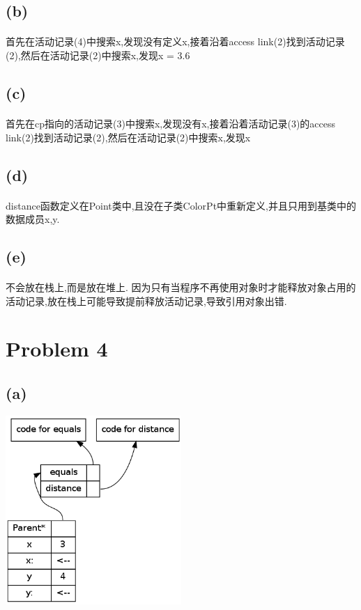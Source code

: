 \documentclass[A4paper,10pt]{paper}
\begin{document}
	\subsection*{(b)}
	\paragraph{} 首先在活动记录(4)中搜索x,发现没有定义x,接着沿着access link(2)找到活动记录(2),然后在活动记录(2)中搜索x,发现x = 3.6
	
	\subsection*{(c)} 
	\paragraph{} 首先在cp指向的活动记录(3)中搜索x,发现没有x,接着沿着活动记录(3)的access link(2)找到活动记录(2),然后在活动记录(2)中搜索x,发现x
	
	\subsection*{(d)}
	\paragraph{} distance函数定义在Point类中,且没在子类ColorPt中重新定义,并且只用到基类中的数据成员x,y.
	
	\subsection*{(e)}
	\paragraph{} 不会放在栈上,而是放在堆上. 因为只有当程序不再使用对象时才能释放对象占用的活动记录,放在栈上可能导致提前释放活动记录,导致引用对象出错.

\section*{Problem 4}
	\subsection*{(a)}
	\includegraphics[width=0.5\textwidth]{./pro4a.png}
\end{document}
